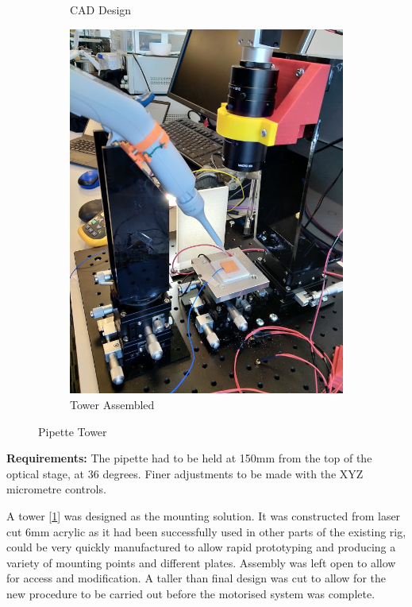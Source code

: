 \begin{figure}
\begin{subfigure}{.3\textwidth}
      \caption{CAD Design}
    \end{subfigure}
    \begin{subfigure}{.3\textwidth}
        \centering
        \includegraphics[height=\linewidth]{img/Tower_ass.jpg}
        \caption{Tower Assembled}
      \end{subfigure}
    \caption{Pipette Tower}
    \label{fig:tower}
  \end{figure}

\textbf{Requirements:} The pipette had to be held at 150mm from the top of the optical stage, at 36 degrees. Finer adjustments to be made with the XYZ micrometre controls. 

A tower [\ref{fig:tower}] was designed as the mounting solution. It was constructed from laser cut 6mm acrylic as it had been successfully used in other parts of the existing rig, could be very quickly manufactured to allow rapid prototyping and producing a variety of mounting points and different plates. Assembly was left open to allow for access and modification. A taller than final design was cut to allow for the new procedure to be carried out before the motorised system was complete.  

